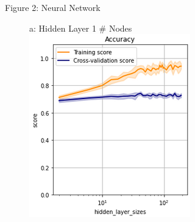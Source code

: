 \documentclass{article}
\begin{document}
\begin{figure}
	\centering
	Figure 2: Neural Network\\
	\begin{subfigure}{.24\textwidth}
		\centering
		a: Hidden Layer 1 \# Nodes
		\includegraphics[width=\linewidth]{poland_nn_hidden_layer_size_2_200_accuracy.png}
		

\end{subfigure}
\end{figure}
\end{document}
